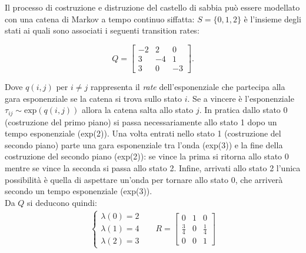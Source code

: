\documentclass[11pt,largemargins]{homework}
\begin{document}
\section{}%
\begin{alphaparts}
    \questionpart
 Il processo di costruzione e distruzione del castello di sabbia può essere modellato con una catena di Markov a tempo continuo siffatta:                                                                        
$S=\{0,1,2\}$ è l'insieme degli stati ai quali sono associati i seguenti transition rates:

\begin{equation*}
  Q=\begin{bmatrix}
        -2 & 2 & 0\\
         3 & -4 & 1 \\
         3 & 0 & -3
      \end{bmatrix}.
\end{equation*} 

Dove \(q(i,j)\) per \(i \neq j\) rappresenta il \textit{rate} dell'esponenziale che partecipa alla gara esponenziale se la catena si trova sullo stato \(i\). Se a vincere è l'esponenziale \(\tau_{ij} \sim \text{exp}(q(i,j))\) allora la catena salta allo stato \(j\). In pratica dallo stato 0 (costruzione del primo piano) si passa necessariamente allo stato 1 dopo un tempo esponenziale (exp(2)). Una volta entrati nello stato 1 (costruzione del secondo piano) parte una gara esponenziale tra l'onda (exp(3)) e la fine della costruzione del secondo piano (exp(2)): se vince la prima si ritorna allo stato 0 mentre se vince la seconda si passa allo stato 2. Infine, arrivati allo stato 2 l'unica possibilità è quella di aspettare un'onda per tornare allo stato 0, che arriverà secondo un tempo esponenziale (exp(3)).
\\

Da \(Q\) si deducono quindi:
\begin{align*}
  \begin{cases}
    \lambda(0) = 2 \\
    \lambda(1) = 4 \\
    \lambda(2) = 3
  \end{cases} && R =
  \begin{bmatrix}
    0 & 1 & 0 \\
    \frac{3}{4} & 0 & \frac{1}{4} \\
    0 & 0 & 1 
  \end{bmatrix}
\end{align*}


\end{alphaparts}
\end{document}
